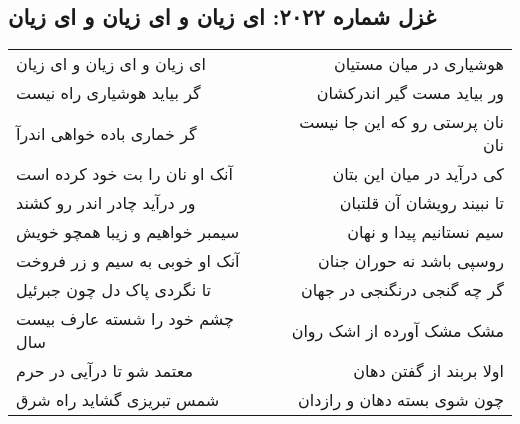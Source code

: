 \begin{center}
\section*{غزل شماره ۲۰۲۲: ای زیان و ای زیان و ای زیان}
\label{sec:2022}
\begin{longtable}{l p{0.5cm} r}
ای زیان و ای زیان و ای زیان
&&
هوشیاری در میان مستیان
\\
گر بیاید هوشیاری راه نیست
&&
ور بیاید مست گیر اندرکشان
\\
گر خماری باده خواهی اندرآ
&&
نان پرستی رو که این جا نیست نان
\\
آنک او نان را بت خود کرده است
&&
کی درآید در میان این بتان
\\
ور درآید چادر اندر رو کشند
&&
تا نبیند رویشان آن قلتبان
\\
سیمبر خواهیم و زیبا همچو خویش
&&
سیم نستانیم پیدا و نهان
\\
آنک او خوبی به سیم و زر فروخت
&&
روسپی باشد نه حوران جنان
\\
تا نگردی پاک دل چون جبرئیل
&&
گر چه گنجی درنگنجی در جهان
\\
چشم خود را شسته عارف بیست سال
&&
مشک مشک آورده از اشک روان
\\
معتمد شو تا درآیی در حرم
&&
اولا بربند از گفتن دهان
\\
شمس تبریزی گشاید راه شرق
&&
چون شوی بسته دهان و رازدان
\\
\end{longtable}
\end{center}
